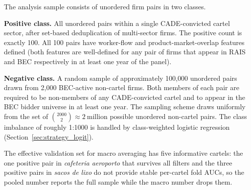 The analysis sample consists of unordered firm pairs in two classes.

\textbf{Positive class.} All unordered pairs within a single CADE-convicted cartel sector, after set-based deduplication of multi-sector firms. The positive count is exactly 100. All 100 pairs have worker-flow and product-market-overlap features defined (both features are well-defined for any pair of firms that appear in RAIS and BEC respectively in at least one year of the panel).

\textbf{Negative class.} A random sample of approximately 100{,}000 unordered pairs drawn from 2{,}000 BEC-active non-cartel firms. Both members of each pair are required to be non-members of any CADE-convicted cartel and to appear in the BEC bidder universe in at least one year. The sampling scheme draws uniformly from the set of $\binom{2000}{2} \approx 2\ \text{million}$ possible unordered non-cartel pairs. The class imbalance of roughly 1:1000 is handled by class-weighted logistic regression (Section~\ref{sec:strategy_logit}).

The effective validation set for macro averaging has five informative cartels: the one positive pair in \emph{cafeteria aeroporto} that survives all filters and the three positive pairs in \emph{sacos de lixo} do not provide stable per-cartel fold AUCs, so the pooled number reports the full sample while the macro number drops them.

